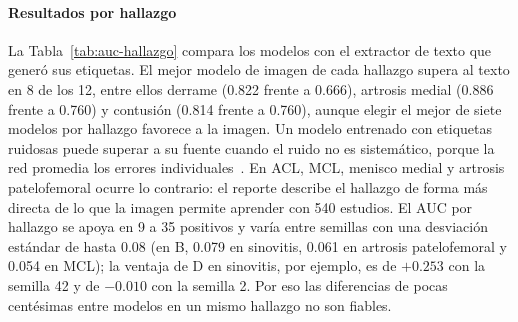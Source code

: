 \documentclass[conference]{IEEEtran}
\begin{document}
\paragraph*{Resultados por hallazgo}
La Tabla~\ref{tab:auc-hallazgo} compara los modelos con el extractor de texto que generó sus etiquetas.
El mejor modelo de imagen de cada hallazgo supera al texto en 8 de los 12, entre ellos derrame (0.822 frente a 0.666), artrosis medial (0.886 frente a 0.760) y contusión (0.814 frente a 0.760), aunque elegir el mejor de siete modelos por hallazgo favorece a la imagen.
Un modelo entrenado con etiquetas ruidosas puede superar a su fuente cuando el ruido no es sistemático, porque la red promedia los errores individuales~\cite{ratner2017snorkel}.
En ACL, MCL, menisco medial y artrosis patelofemoral ocurre lo contrario: el reporte describe el hallazgo de forma más directa de lo que la imagen permite aprender con 540 estudios.
El AUC por hallazgo se apoya en 9 a 35 positivos y varía entre semillas con una desviación estándar de hasta 0.08 (en B, 0.079 en sinovitis, 0.061 en artrosis patelofemoral y 0.054 en MCL); la ventaja de D en sinovitis, por ejemplo, es de $+0.253$ con la semilla 42 y de $-0.010$ con la semilla 2.
Por eso las diferencias de pocas centésimas entre modelos en un mismo hallazgo no son fiables.
\end{document}
